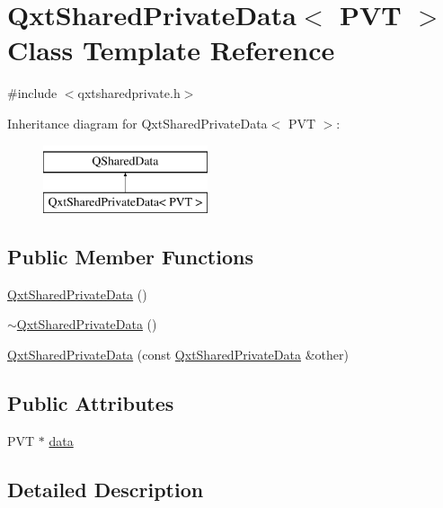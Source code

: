 \hypertarget{class_qxt_shared_private_data}{\section{Qxt\-Shared\-Private\-Data$<$ P\-V\-T $>$ Class Template Reference}
\label{class_qxt_shared_private_data}
}


{\ttfamily \#include $<$qxtsharedprivate.\-h$>$}

Inheritance diagram for Qxt\-Shared\-Private\-Data$<$ P\-V\-T $>$\-:\begin{figure}[H]
\begin{center}
\leavevmode
\includegraphics[height=2.000000cm]{class_qxt_shared_private_data}
\end{center}
\end{figure}
\subsection*{Public Member Functions}
\begin{DoxyCompactItemize}
\item 
\hyperlink{class_qxt_shared_private_data_a1288f8cc0675b6d6fff350212e8682f2}{Qxt\-Shared\-Private\-Data} ()
\item 
\hyperlink{class_qxt_shared_private_data_ae9c83ed4d679bf6d84746f22ffebf6c7}{$\sim$\-Qxt\-Shared\-Private\-Data} ()
\item 
\hyperlink{class_qxt_shared_private_data_ab937a780af088ef3e568cf80b9ff7f14}{Qxt\-Shared\-Private\-Data} (const \hyperlink{class_qxt_shared_private_data}{Qxt\-Shared\-Private\-Data} \&other)
\end{DoxyCompactItemize}
\subsection*{Public Attributes}
\begin{DoxyCompactItemize}
\item 
P\-V\-T $\ast$ \hyperlink{class_qxt_shared_private_data_a519bac418437100e559c9be452722bac}{data}
\end{DoxyCompactItemize}


\subsection{Detailed Description}
